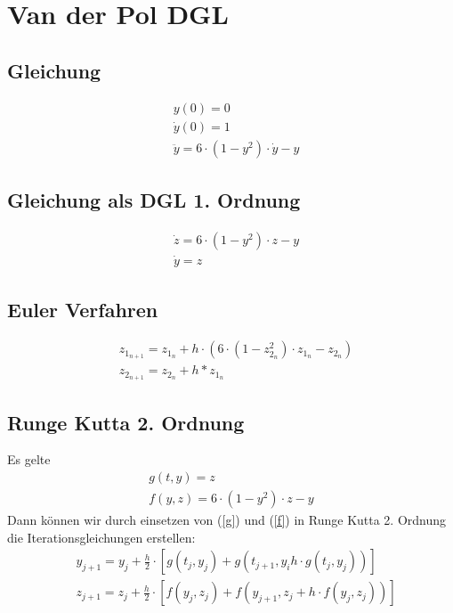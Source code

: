 \documentclass[10pt]{scrartcl}
\author{Oliver Steenbuck, Karolina Bernat}
\title{\titletext}
\date{31.10.2012}
\begin{document}
\maketitle
\setcounter{tocdepth}{3}
\tableofcontents
\listoffigures
\lstlistoflistings

\section{Van der Pol DGL}
	\subsection{Gleichung}
		\begin{align}
		&y(0) = 0\\
		&\dot{y}(0) = 1\\
		&\ddot{y} = 6 \cdot (1-y^2) \cdot \dot{y} -y
		\end{align}
	\subsection{Gleichung als DGL 1. Ordnung}
		\begin{align}
			&\dot{z} = 6 \cdot (1-y^2) \cdot z - y\\
			&\dot{y} = z
		\end{align}
		
	\subsection{Euler Verfahren}
	\begin{align}
		&z_{1_{n+1}} = z_{1_{n}} + h \cdot (6 \cdot (1-z_{2_{n}}^2) \cdot z_{1_{n}} - z_{2_{n}})\\
		&z_{2_{n+1}} = z_{2_n} + h * z_{1_n}
	\end{align}
	
	
	\subsection{Runge Kutta 2. Ordnung}
	Es gelte	
	\begin{align}
		g(t,y) = z \label{g}\\		
		f(y,z) = 6 \cdot (1-y^2) \cdot z - y \label{f}
	\end{align}
	Dann können wir durch einsetzen von (\ref{g}) und (\ref{f}) in Runge Kutta 2. Ordnung die Iterationsgleichungen erstellen:
	\begin{align}
		&y_{j+1}=y_j + \frac{h}{2} \cdot [g(t_j, y_j) + g(t_{j+1}, y_i h \cdot g(t_j, y_j))]\\
		&z_{j+1}=z_j + \frac{h}{2} \cdot [f(y_j, z_j) + f(y_{j+1}, z_j + h \cdot f(y_j, z_j))]
	\end{align} 
	
	
	
	
\end{document}
